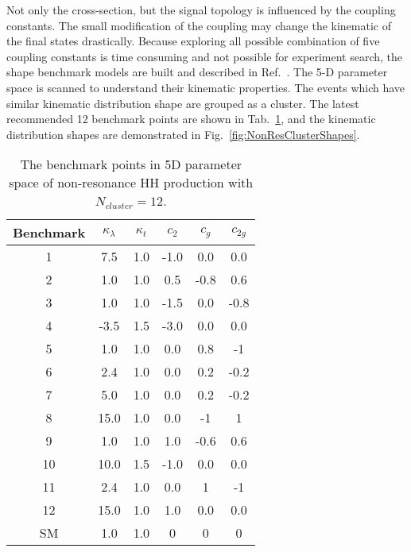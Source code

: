 Not only the cross-section, but the signal topology is influenced by the coupling constants.
The small modification of the coupling may change the kinematic of the final states drastically.
Because exploring all possible combination of five coupling constants is time consuming and not possible for experiment search, the shape benchmark models are built and described in Ref.~\cite{1507.02245}.
The 5-D parameter space is scanned to understand their kinematic properties.
The events which have similar kinematic distribution shape are grouped as a cluster.
The latest recommended 12 benchmark points are shown in Tab.~\ref{tab:NonResBenchN12}, and the kinematic distribution shapes are demonstrated in Fig.~\ref{fig:NonResClusterShapes}.

\begin{table}[h]
\centering
\caption{The benchmark points in 5D parameter space of non-resonance HH production with $N_{cluster}=12$.}
\label{tab:NonResBenchN12}
\begin{tabular}{cccccc}
\hline
Benchmark                & $\kappa_{\lambda}$ & $\kappa_{t}$ & $c_{2}$ & $c_{g}$ & $c_{2g}$ \\ \hline
1                        & 7.5               & 1.0         & -1.0    & 0.0     & 0.0      \\
2                        & 1.0               & 1.0         & 0.5     & -0.8    & 0.6      \\
3                        & 1.0               & 1.0         & -1.5    & 0.0     & -0.8     \\
4                        & -3.5              & 1.5         & -3.0    & 0.0     & 0.0      \\
5                        & 1.0               & 1.0         & 0.0     & 0.8     & -1       \\
6                        & 2.4               & 1.0         & 0.0     & 0.2     & -0.2     \\
7                        & 5.0               & 1.0         & 0.0     & 0.2     & -0.2     \\
8                        & 15.0              & 1.0         & 0.0     & -1      & 1        \\
9                        & 1.0               & 1.0         & 1.0     & -0.6    & 0.6      \\
10                       & 10.0              & 1.5         & -1.0    & 0.0     & 0.0      \\
11                       & 2.4               & 1.0         & 0.0     & 1       & -1       \\ 
12                       & 15.0              & 1.0         & 1.0     & 0.0     & 0.0      \\ \hline
SM                       & 1.0               & 1.0         & 0       & 0       & 0        \\ \hline
\end{tabular}
\end{table}

